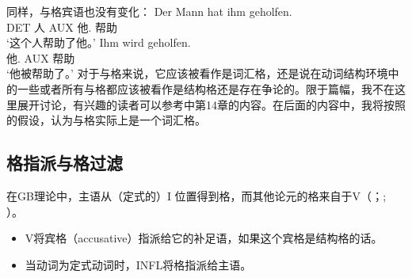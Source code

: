 同样，与格宾语也没有变化：
\eal
\ex 
\gll Der Mann hat ihm geholfen.\\
	 DET 人 AUX 他.\dat{} 帮助\\
\glt `这个人帮助了他。'
\ex 
\gll Ihm wird geholfen.\\
	 他.\dat{} AUX 帮助\\
\glt `他被帮助了。'
\zl
对于与格来说，它应该被看作是词汇格，还是说在动词结构环境中的一些或者所有与格都应该被看作是结构格还是存在争论的。限于篇幅，我不在这里展开讨论，有兴趣的读者可以参考中第14章的内容。在后面的内容中，我将按照\citet[]{Haider86} 的假设，认为与格实际上是一个词汇格。 



\subsection{格指派与格过滤}
\label{sec-case-assignment}

在GB理论中，主语从（定式的）I 位置得到格，而其他论元的格来自于V（\citealp[]{Chomsky81a}；\citealp[]{Haider84b}; \citealp[--73]{FF87}）。
\begin{principle-break}[格指派原则]\label{Kasusprinzip-GB}
\begin{itemize}
\item V将宾格（accusative）指派给它的补足语，如果这个宾格是结构格的话。 
\item 当动词为定式动词时，INFL将格指派给主语。 
\end{itemize}
\end{principle-break}

